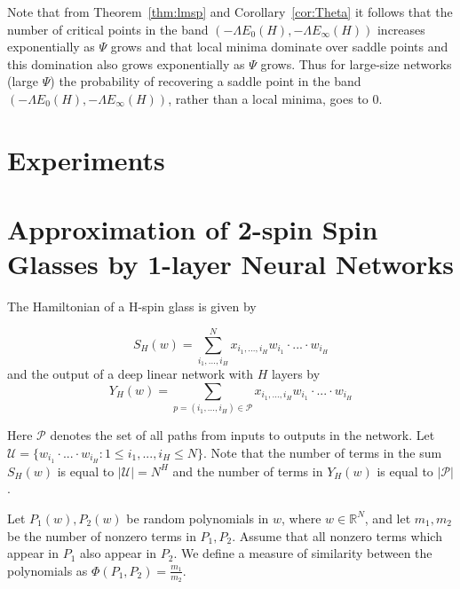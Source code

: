 \documentclass[twoside]{article}
\begin{document}
Note that from Theorem~\ref{thm:lmsp} and Corollary~\ref{cor:Theta} it follows that the number of critical points in the band $\left(-\Lambda E_0(H),-\Lambda E_{\infty}(H)\right)$ increases exponentially as $\Psi$ grows and that local minima dominate over saddle points and this domination also grows exponentially as $\Psi$ grows. Thus for large-size networks (large $\Psi$) the probability of recovering a saddle point in the band $\left(-\Lambda E_0(H),-\Lambda E_{\infty}(H)\right)$, rather than a local minima, goes to $0$.

\section{Experiments}
\label{sec:Experiments}




\newpage

\toptitlebar 
{\Large \bf  {} \par}
\bottomtitlebar

\section{Approximation of 2-spin Spin Glasses by 1-layer Neural Networks}

The Hamiltonian of a H-spin glass is given by 

\begin{equation}
 S_H(w) = \sum_{i_1,...,i_H}^N x_{i_1,...,i_H} w_{i_1} \cdot ... \cdot w_{i_H}
\end{equation}
and the output of a deep linear network with $H$ layers by 
\begin{equation}
 Y_H(w) = \sum_{p = (i_1,...,i_H) \in \mathcal{P}} x_{i_1,...,i_H} w_{i_1} \cdot ... \cdot w_{i_H}
\end{equation}

Here $\mathcal{P}$ denotes the set of all paths from inputs to outputs in the network. Let $\mathcal{U} = \{ w_{i_1} \cdot ... \cdot w_{i_H} : 1 \leq i_1,...,i_H \leq N \} $.
Note that the number of terms in the sum $S_H(w)$ is equal to $|\mathcal{U}| = N^H$ and the number of terms in $Y_H(w)$ is equal to $|\mathcal{P}|$.

\begin{definition}
 Let $P_1(w), P_2(w)$ be random polynomials in $w$, where $w \in \mathbb{R}^N$, and let $m_1,m_2$ be the number of nonzero terms in $P_1,P_2$. Assume that all nonzero terms which appear in $P_1$ also appear in $P_2$. 
 We define a measure of similarity between the polynomials as $\Phi(P_1,P_2) = \frac{m_1}{m_2}$.
\end{definition}
\end{document}
